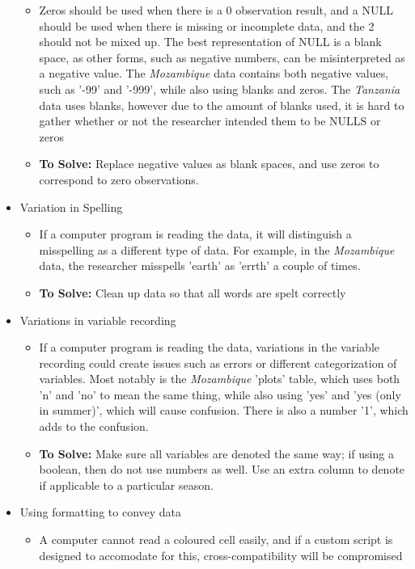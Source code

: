 \documentclass{article}
\begin{document}
\begin{itemize}
    \begin{itemize}
        \item Zeros should be used when there is a 0 observation result, and a NULL should be used when there is missing or incomplete data, and the 2 should not be mixed up. The best representation of NULL is a blank space, as other forms, such as negative numbers, can be misinterpreted as a negative value. The \textit{Mozambique} data contains both negative values, such as '-99' and '-999', while also using blanks and zeros. The \textit{Tanzania} data uses blanks, however due to the amount of blanks used, it is hard to gather whether or not the researcher intended them to be NULLS or zeros
        \item \textbf{To Solve:} Replace negative values as blank spaces, and use zeros to correspond to zero observations. 
    \end{itemize}
    \item Variation in Spelling
    \begin{itemize}
        \item If a computer program is reading the data, it will distinguish a misspelling as a different type of data. For example, in the \textit{Mozambique} data, the researcher misspells 'earth' as 'errth' a couple of times.
        \item \textbf{To Solve:} Clean up data so that all words are spelt correctly
    \end{itemize}
    \item Variations in variable recording
    \begin{itemize}
        \item If a computer program is reading the data, variations in the variable recording could create issues such as errors or different categorization of variables. Most notably is the \textit{Mozambique} 'plots' table, which uses both 'n' and 'no' to mean the same thing, while also using 'yes' and 'yes (only in summer)', which will cause confusion. There is also a number '1', which adds to the confusion.
        \item \textbf{To Solve:} Make sure all variables are denoted the same way; if using a boolean, then do not use numbers as well. Use an extra column to denote if applicable to a particular season.
    \end{itemize}
    \item Using formatting to convey data
    \begin{itemize}
        \item A computer cannot read a coloured cell easily, and if a custom script is designed to accomodate for this, cross-compatibility will be compromised

\end{itemize}
\end{itemize}
\end{document}
